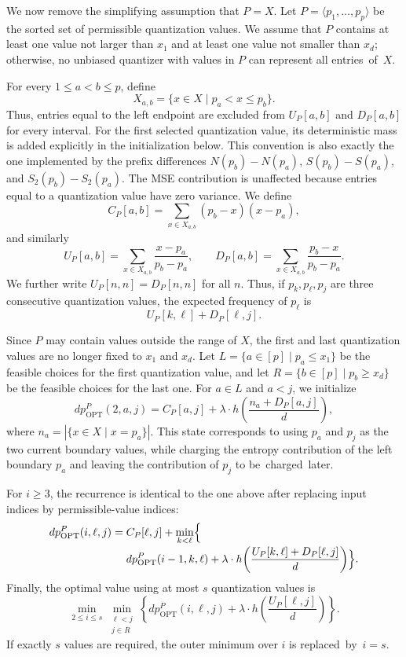 \documentclass[11pt,letterpaper]{article}
\begin{document}
{We now remove the simplifying assumption that $P=X$. Let
$P=\langle p_1,\ldots,p_p\rangle$ be the sorted set of permissible quantization
values. We assume that $P$ contains at least one value not larger than $x_1$ and
at least one value not smaller than $x_d$; otherwise, no unbiased quantizer with
values in $P$ can represent all \mbox{entries of $X$.}

For every $1\le a<b\le p$, define \[
X_{a,b}=\{x\in X\mid p_a<x\le p_b\}.
\] Thus, entries equal to the left endpoint are excluded from $U_P[a,b]$ and $D_P[a,b]$ for every interval. For the first selected quantization value, its deterministic mass is added explicitly in the initialization below. This convention is also exactly the one implemented by the prefix differences
$N(p_b)-N(p_a)$, $S(p_b)-S(p_a)$, and $S_2(p_b)-S_2(p_a)$. The MSE contribution
is unaffected because entries equal to a quantization value have zero variance.
We define
\[
C_P[a,b] =
\sum_{x\in X_{a,b}} (p_b-x)(x-p_a),
\]
and similarly
{\small
\[
U_P[a,b]=\sum_{x\in X_{a,b}} \frac{x-p_a}{p_b-p_a},
\qquad
D_P[a,b]=\sum_{x\in X_{a,b}} \frac{p_b-x}{p_b-p_a}.
\]
}
We further write $U_P[n,n]=D_P[n,n]$ for all $n$.
Thus, if $p_k,p_\ell,p_j$ are three consecutive quantization values, the
expected frequency of $p_\ell$ is
\[
U_P[k,\ell] + D_P[\ell,j].
\]

Since $P$ may contain values outside the range of $X$, the first and last
quantization values are no longer fixed to $x_1$ and $x_d$. Let
$L=\{a\in[p]\mid p_a\le x_1\}$ be the feasible choices for the first
quantization value, and let $R=\{b\in[p]\mid p_b\ge x_d\}$ be the feasible
choices for the last one. For $a\in L$ and $a<j$, we initialize
\[
dp^P_{\mathrm{OPT}}(2,a,j)
=
C_P[a,j]
+
\lambda\cdot
h\!\left(
\frac{n_a + D_P[a,j]}{d}
\right),
\]
where $n_a = |\{x\in X \mid x=p_a\}|$. This state corresponds to using
$p_a$ and $p_j$ as the two current boundary values, while charging the entropy
contribution of the left boundary $p_a$ and leaving the contribution of $p_j$
to \mbox{be charged later.}

For $i\ge 3$, the recurrence is identical to the one above after replacing
input indices by permissible-value indices:
{\scriptsize
\[
\begin{aligned}
dp^P_{\mathrm{OPT}}(i,\ell,j)
={}&C_P[\ell,j]+\min_{k<\ell}\Bigl\{\\[-0.5ex]
&dp^P_{\mathrm{OPT}}(i-1,k,\ell)+\lambda\cdot h\!\left(
\frac{U_P[k,\ell]+D_P[\ell,j]}{d}
\right)\Bigr\}.
\end{aligned}
\]
}
Finally, the optimal value using at most $s$ quantization values is
\[
\min_{2\le i\le s}
\min_{\substack{\ell<j\\ j\in R}}
\left\{
dp^P_{\mathrm{OPT}}(i,\ell,j)
+
\lambda\cdot
h\!\left(
\frac{U_P[\ell,j]}{d}
\right)
\right\}.
\]
If exactly $s$ values are required, the outer minimum over $i$ is \mbox{replaced by
$i=s$.}

}
\end{document}
